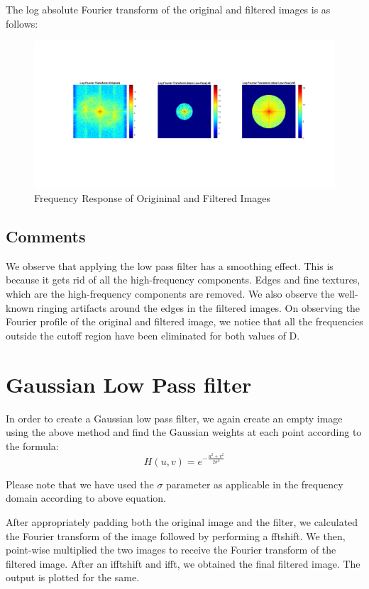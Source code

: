 \documentclass[a4paper]{article}
\begin{document}
The log absolute Fourier transform of the original and filtered images is as follows:
\begin{figure}[h]
    \centering
    \includegraphics[width=\linewidth]{img2.png}
    \caption{Frequency Response of Origininal and Filtered Images}
\end{figure}

\subsection{Comments}
We observe that applying the low pass filter has a smoothing effect. This is because it gets rid of all the high-frequency components. Edges and fine textures, which are the high-frequency components are removed. We also observe the well-known ringing artifacts around the edges in the filtered images.
On observing the Fourier profile of the original and filtered image, we notice that all the frequencies outside the cutoff region have been eliminated for both values of D.


\section{Gaussian Low Pass filter}
In order to create a Gaussian low pass filter, we again create an empty image using the above method and find the Gaussian weights at each point according to the formula:
\[ H(u,v) = e^{-\frac{u^2 +v^2}{2\sigma^2}}\]

Please note that we have used the $\sigma$ parameter as applicable in the frequency domain according to above equation.
 
After appropriately padding both the original image and the filter, we calculated the Fourier transform of the image followed by performing a fftshift.
We then, point-wise multiplied the two images to receive the Fourier transform of the filtered image. After an ifftshift and ifft, we obtained the final filtered image. The output is plotted for the same.
\end{document}
